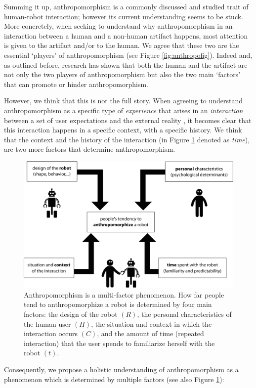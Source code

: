 \documentclass{frontiersSCNS} %
\begin{document}
Summing it up, anthropomorphism is a commonly discussed and
studied trait of human-robot interaction; however its current understanding seems to be stuck.
More concretely, when seeking to understand why anthropomorphism in an interaction between a human and a non-human artifact happens, most attention is given to the artifact and/or to the human. We agree that these two are the essential `players' of anthropomorphism (see Figure \ref{fig:anthropofig}). Indeed and, as outlined before, research has shown that both the human and the artifact are not only the two players of anthropomorphism but also the two main `factors' that can promote or hinder anthropomorphism.

However, we think that this is not the full story. When agreeing to understand anthropomorphism as a specific type of \textit{experience} that arises in an
\textit{interaction} between a set of user expectations and the external reality \citep{persson_anthropomorphism_2000}, 
it becomes clear that this interaction happens in a specific context, with a specific history. We think that the context and the history of the interaction (in Figure \ref{fig:factors} denoted as \textit{time}), are two more factors that determine anthropomorphism.

\begin{figure}
    \centering
    \includegraphics[width=0.7\columnwidth]{factors}
    \caption{Anthropomorphism is a multi-factor phenomenon. How far people tend to anthropomorphize a robot is determined by four main factors: the design of the robot $(R)$, the personal characteristics of the human user $(H)$, the situation and context in which the interaction occurs $(C)$, and the amount of time (repeated interaction) that the user spends to familiarize herself with the robot $(t)$.}
    \label{fig:factors}
\end{figure}

Consequently, we propose a holistic understanding of anthropomorphism as a phenomenon which is determined by multiple factors (see also Figure \ref{fig:factors}):
\end{document}
